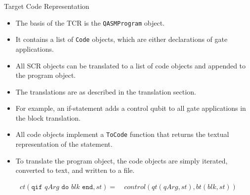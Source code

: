 \begin{frame}{Target Code Representation}
    \begin{itemize}
        \item The basis of the TCR is the \texttt{QASMProgram} object.
        \item It contains a list of \texttt{Code} objects, which are either declarations of gate applications. 
        \item All SCR objects can be translated to a list of code objects and appended to the program object.
        \item The translations are as described in the translation section.
        \item For example, an if-statement adds a control qubit to all gate applications in the block translation.
        \item All code objects implement a \texttt{ToCode} function that returns the textual representation of the statement.
        \item To translate the program object, the code objects are simply iterated, converted to text, and written to a file. 
    \end{itemize}
    \vfill
    \begin{align*}        
        ct(\texttt{qif } qArg \texttt{ do } blk \texttt{ end}, st) = \ &  control(qt(qArg, st), bt(blk, st)) \\
    \end{align*}
\end{frame}


